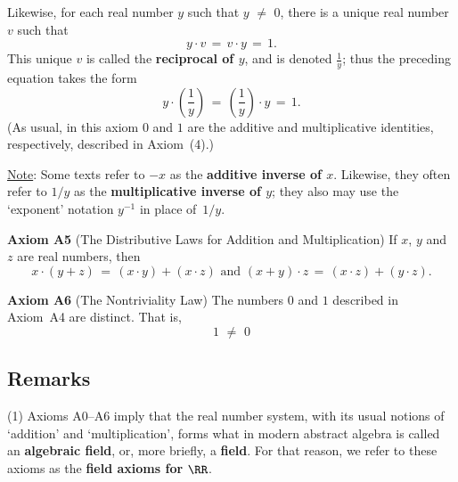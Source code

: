         Likewise, for each real number $y$ such that $y \,\,{\neq}\,\, 0$,
    there is a unique real number $v$ such that
        \begin{displaymath}
        y{\cdot}v \,=\, v{\cdot}y  \,=\, 1.
        \end{displaymath}
    This unique $v$ is called the {\bf reciprocal of $y$}, and is denoted ${\displaystyle \frac{1}{y}}$; thus the preceding equation takes the form
        \begin{displaymath}
        y{\cdot}\left(\frac{1}{y}\right) \,=\, \left(\frac{1}{y}\right){\cdot}y  \,=\, 1.
        \end{displaymath}
    (As usual, in this axiom $0$ and $1$ are the additive and multiplicative identities, respectively, described in Axiom~(4).)

        \underline{Note}: Some texts refer to $-x$ as the {\bf additive inverse of $x$}. Likewise, they often refer to $1/y$ as the {\bf multiplicative inverse of $y$}; they also may use the `exponent' notation $y^{-1}$ in place of~$1/y$.

\V

        {\bf Axiom A5} (The Distributive Laws for Addition and Multiplication) If $x$, $y$ and $z$ are real numbers, then
        \begin{displaymath}
        x{\cdot}(y+z) \,=\, (x{\cdot}y) + (x{\cdot}z) \mbox{ and } 
        (x+y){\cdot}z \,=\, (x{\cdot}z) + (y{\cdot}z).
        \end{displaymath}

\V

        {\bf Axiom A6} (The Nontriviality Law) The numbers $0$ and $1$ described in Axiom~A4 are distinct. That is,
        \begin{displaymath}
        1 \,\,{\neq}\,\, 0
        \end{displaymath}

\V
\V

            \subsection{\small{\bf Remarks}}
            \label{RemrkB10.20}


\hspace*{\parindent} (1) Axioms A0--A6 imply that the real number system, with its usual notions of `addition' and `multiplication',
    forms what in modern abstract algebra is called an {\bf algebraic field}, or, more briefly, a {\bf field}.
    For that reason, we refer to these axioms as the {\bf field axioms for ${\RR}$}.


